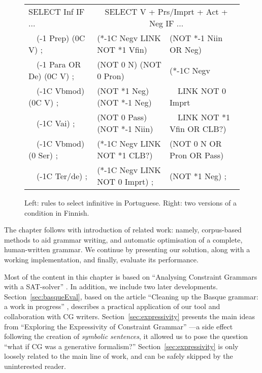 

\begin{figure}[t]
\ttfamily
\centering
\begin{tabular}{l | @{~~~} l  l}
SELECT Inf IF ... & \multicolumn{2}{c}{SELECT V + Prs/Imprt + Act + Neg IF ...} \\
~~(-1 Prep) (0C V) ;       & (*-1C Negv LINK NOT *1 Vfin)  & (NOT *-1 Niin OR Neg)  \\
~~(-1 Para OR De) (0C V) ; & (NOT 0 N) (NOT 0 Pron)        & (*-1C Negv \\
~~(-1C Vbmod) (0C V) ;     & (NOT *1 Neg) (NOT *-1 Neg)    &  ~~LINK NOT 0 Imprt \\
~~(-1C Vai) ;              & (NOT 0 Pass) (NOT *-1 Niin)   &  ~~LINK NOT *1 Vfin OR CLB?) \\
~~(-1C Vbmod) (0 Ser) ;    & (*-1C Negv LINK NOT *1 CLB?)  & (NOT 0 N OR Pron OR Pass) \\
~~(-1C Ter/de) ;           & (*-1C Negv LINK NOT 0 Imprt) ;  & (NOT *1 Neg) ; \\

\end{tabular}

\caption{Left: rules to select infinitive in Portuguese.
        Right: two versions of a condition in Finnish.}

\label{fig:infrules}
\end{figure}

The chapter follows with introduction of related work: namely,
corpus-based methods to aid grammar writing, and automatic
optimisation of a complete, human-written grammar. We continue by
presenting our solution, along with a working implementation, and
finally, evaluate its performance.

Most of the content in this chapter is based on ``Analysing Constraint
Grammars with a SAT-solver'' \cite{listenmaa_claessen2016}. In
addition, we include two later
developments. Section~\ref{sec:basqueEval}, based on the article
``Cleaning up the Basque grammar: a work in progress''
\cite{listenmaa2017basque}, describes a practical application of our
tool and collaboration with CG writers.
Section~\ref{sec:expressivity} presents the main ideas from
``Exploring the Expressivity of Constraint Grammar''
\cite{kokke2017expressivity}---a side effect following the creation of
\emph{symbolic sentences}, it allowed us to pose the question ``what
if CG was a generative formalism?'' Section~\ref{sec:expressivity} is
only loosely related to the main line of work, and can be safely
skipped by the uninterested reader.

